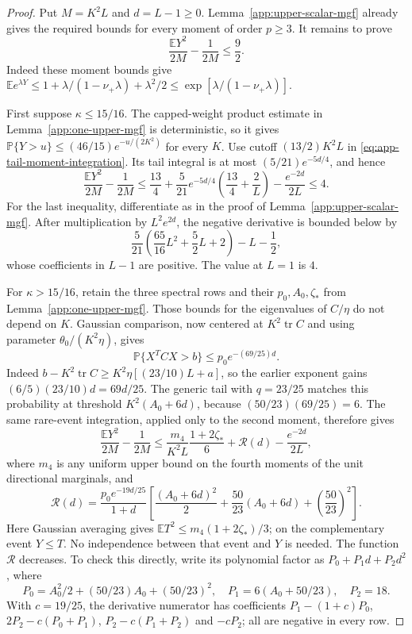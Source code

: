 \documentclass[11pt,a4paper]{article}
\newcommand{\E}{\mathbb E}
\newcommand{\PP}{\mathbb P}
\numberwithin{equation}{section}
\begin{document}
\begin{proof}
Put $M=K^2L$ and $d=L-1\ge0$.
Lemma~\ref{app:upper-scalar-mgf} already gives the required bounds for
every moment of order $p\ge3$. It remains to prove
\begin{equation}\label{eq:app-general-second-target}
 \frac{\E Y^2}{2M}-\frac1{2M}\le\frac92.
\end{equation}
Indeed these moment bounds give
$\E e^{\lambda Y}\le1+\lambda/(1-\nu_+\lambda)+\lambda^2/2
\le\exp[\lambda/(1-\nu_+\lambda)]$.

First suppose $\kappa\le15/16$.
The capped-weight product estimate in Lemma~\ref{app:one-upper-mgf}
is deterministic, so it gives
$\PP\{Y>u\}\le(46/15)e^{-u/(2K^2)}$ for every $K$.
Use cutoff $(13/2)K^2L$ in
\eqref{eq:app-tail-moment-integration}. Its tail integral is at most
$(5/21)e^{-5d/4}$, and hence
\[
 \frac{\E Y^2}{2M}-\frac1{2M}
 \le\frac{13}{4}+\frac5{21}e^{-5d/4}
       \left(\frac{13}{4}+\frac2L\right)-\frac{e^{-2d}}{2L}\le4.
\]
For the last inequality, differentiate as in the proof of
Lemma~\ref{app:upper-scalar-mgf}. After multiplication by
$L^2e^{2d}$, the negative derivative is bounded below by
\[
 \frac5{21}\left(\frac{65}{16}L^2+\frac52L+2\right)-L-\frac12,
\]
whose coefficients in $L-1$ are positive. The value at $L=1$ is $4$.

For $\kappa>15/16$, retain the three spectral rows and their
$p_0,A_0,\zeta_*$ from Lemma~\ref{app:one-upper-mgf}.
Those bounds for the eigenvalues of $C/\eta$ do not depend on $K$.
Gaussian comparison, now centered at $K^2\operatorname{tr}C$ and
using parameter $\theta_0/(K^2\eta)$, gives
\[
 \PP\{X^TCX>b\}\le p_0e^{-(69/25)d}.
\]
Indeed $b-K^2\operatorname{tr}C\ge K^2\eta[(23/10)L+a]$,
so the earlier exponent gains $(6/5)(23/10)d=69d/25$.
The generic tail with $q=23/25$ matches this probability at threshold
$K^2(A_0+6d)$, because $(50/23)(69/25)=6$.
The same rare-event integration, applied only to the second moment,
therefore gives
\begin{equation}\label{eq:app-general-second-rare}
 \frac{\E Y^2}{2M}-\frac1{2M}
 \le \frac{m_4}{K^2L}\frac{1+2\zeta_*}{6}
        +\mathcal R(d)-\frac{e^{-2d}}{2L},
\end{equation}
where $m_4$ is any uniform upper bound on the fourth moments of the
unit directional marginals, and
\[
 \mathcal R(d)=\frac{p_0e^{-19d/25}}{1+d}
       \left[\frac{(A_0+6d)^2}{2}
             +\frac{50}{23}(A_0+6d)+\left(\frac{50}{23}\right)^2\right].
\]
Here Gaussian averaging gives
$\E T^2\le m_4(1+2\zeta_*)/3$; on the complementary event $Y\le T$.
No independence between that event and $Y$ is needed.
The function $\mathcal R$ decreases. To check this directly, write
its polynomial factor as $P_0+P_1d+P_2d^2$, where
\[
 P_0=A_0^2/2+(50/23)A_0+(50/23)^2,\quad
 P_1=6(A_0+50/23),\quad P_2=18.
\]
With $c=19/25$, the derivative numerator has coefficients
$P_1-(1+c)P_0$, $2P_2-c(P_0+P_1)$,
$P_2-c(P_1+P_2)$ and $-cP_2$; all are negative in every row.


\end{proof}
\end{document}
